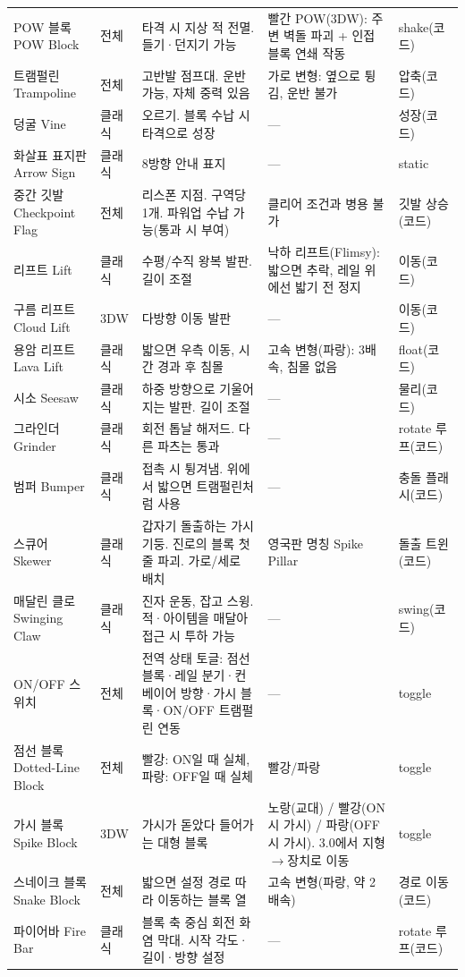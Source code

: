 \documentclass[10pt,a4paper]{article}
\begin{document}
\begin{longtable}{L{2.9cm} L{1.4cm} L{6.2cm} L{2.7cm} L{1.8cm}}
POW 블록 POW Block & 전체 & 타격 시 지상 적 전멸. 들기·던지기 가능 & 빨간 POW(3DW): 주변 벽돌 파괴 + 인접 블록 연쇄 작동 & shake(코드) \\
트램펄린 Trampoline & 전체 & 고반발 점프대. 운반 가능, 자체 중력 있음 & 가로 변형: 옆으로 튕김, 운반 불가 & 압축(코드) \\
덩굴 Vine & 클래식 & 오르기. 블록 수납 시 타격으로 성장 & — & 성장(코드) \\
화살표 표지판 Arrow Sign & 클래식 & 8방향 안내 표지 & — & static \\
중간 깃발 Checkpoint Flag & 전체 & 리스폰 지점. 구역당 1개. 파워업 수납 가능(통과 시 부여) & 클리어 조건과 병용 불가 & 깃발 상승(코드) \\
리프트 Lift & 클래식 & 수평/수직 왕복 발판. 길이 조절 & 낙하 리프트(Flimsy): 밟으면 추락, 레일 위에선 밟기 전 정지 & 이동(코드) \\
구름 리프트 Cloud Lift & 3DW & 다방향 이동 발판 & — & 이동(코드) \\
용암 리프트 Lava Lift & 클래식 & 밟으면 우측 이동, 시간 경과 후 침몰 & 고속 변형(파랑): 3배속, 침몰 없음 & float(코드) \\
시소 Seesaw & 클래식 & 하중 방향으로 기울어지는 발판. 길이 조절 & — & 물리(코드) \\
그라인더 Grinder & 클래식 & 회전 톱날 해저드. 다른 파츠는 통과 & — & rotate 루프(코드) \\
범퍼 Bumper & 클래식 & 접촉 시 튕겨냄. 위에서 밟으면 트램펄린처럼 사용 & — & 충돌 플래시(코드) \\
스큐어 Skewer & 클래식 & 갑자기 돌출하는 가시 기둥. 진로의 블록 첫 줄 파괴. 가로/세로 배치 & 영국판 명칭 Spike Pillar & 돌출 트윈(코드) \\
매달린 클로 Swinging Claw & 클래식 & 진자 운동, 잡고 스윙. 적·아이템을 매달아 접근 시 투하 가능 & — & swing(코드) \\
ON/OFF 스위치 & 전체 & 전역 상태 토글: 점선 블록·레일 분기·컨베이어 방향·가시 블록·ON/OFF 트램펄린 연동 & — & toggle \\
점선 블록 Dotted-Line Block & 전체 & 빨강: ON일 때 실체, 파랑: OFF일 때 실체 & 빨강/파랑 & toggle \\
가시 블록 Spike Block & 3DW & 가시가 돋았다 들어가는 대형 블록 & 노랑(교대) / 빨강(ON 시 가시) / 파랑(OFF 시 가시). 3.0에서 지형$\to$장치로 이동 & toggle \\
스네이크 블록 Snake Block & 전체 & 밟으면 설정 경로 따라 이동하는 블록 열 & 고속 변형(파랑, 약 2배속) & 경로 이동(코드) \\
파이어바 Fire Bar & 클래식 & 블록 축 중심 회전 화염 막대. 시작 각도·길이·방향 설정 & — & rotate 루프(코드) \\

\end{longtable}
\end{document}
